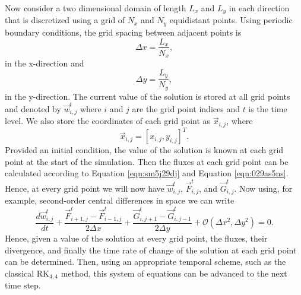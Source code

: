 Now consider a two dimensional domain of length $L_x$ and $L_y$ in each direction that is discretized using a grid of $N_x$ and $N_y$ equidistant points. Using periodic boundary conditions, the grid spacing between adjacent points is
\begin{equation}
	\Delta x = \frac{L_x}{N_x},
\end{equation}
in the x-direction and
\begin{equation}
	\Delta y = \frac{L_y}{N_y},
\end{equation}
in the y-direction. The current value of the solution is stored at all grid points and denoted by $\vec{w}_{i,j}^t$ where $i$ and $j$ are the grid point indices and $t$ is the time level. We also store the coordinates of each grid point as $\vec{x}_{i,j}$, where 
\begin{equation}
	\vec{x}_{i,j} = [x_{i,j},y_{i,j}]^T.
\end{equation}
Provided an initial condition, the value of the solution is known at each grid point at the start of the simulation. Then the fluxes at each grid point can be calculated according to Equation \ref{eqn:sm5j29dj} and Equation \ref{eqn:029as5ns}. Hence, at every grid point we will now have $\vec{w}_{i,j}^t$, $\vec{F}_{i,j}^t$, and $\vec{G}_{i,j}^t$. Now using, for example, second-order central differences in space we can write
\begin{equation}
	\frac{d \vec{w}_{i,j}^t}{d t} + \frac{\vec{F}_{i+1,j}^t-\vec{F}_{i-1,j}^t}{2\Delta x} + \frac{\vec{G}_{i,j+1}^t-\vec{G}_{i,j-1}^t}{2\Delta y} + \mathcal{O}(\Delta x^2,\Delta y^2) = 0.
\end{equation}
Hence, given a value of the solution at every grid point, the fluxes, their divergence, and finally the time rate of change of the solution at each grid point can be determined. Then, using an appropriate temporal scheme, such as the classical RK$_{4,4}$ method, this system of equations can be advanced to the next time step.

